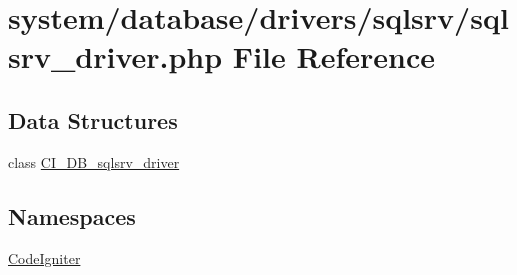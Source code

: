 \hypertarget{sqlsrv__driver_8php}{\section{system/database/drivers/sqlsrv/sqlsrv\-\_\-driver.php File Reference}
\label{sqlsrv__driver_8php}
}
\subsection*{Data Structures}
\begin{DoxyCompactItemize}
\item 
class \hyperlink{class_c_i___d_b__sqlsrv__driver}{C\-I\-\_\-\-D\-B\-\_\-sqlsrv\-\_\-driver}
\end{DoxyCompactItemize}
\subsection*{Namespaces}
\begin{DoxyCompactItemize}
\item 
\hyperlink{namespace_code_igniter}{Code\-Igniter}
\end{DoxyCompactItemize}
